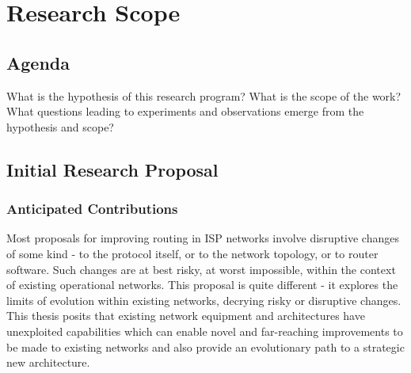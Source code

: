 \chapter{Research Scope}

\section{Agenda}

What is the hypothesis of this research program?
What is the scope of the work?
What questions leading to experiments and observations emerge from the hypothesis and scope?





\section{Initial Research Proposal}

\subsection{Anticipated Contributions}

Most proposals for improving routing in ISP networks involve disruptive changes of some kind - to the protocol itself, or to the network topology, or to router software. Such changes are at best risky, at worst impossible, within the context of existing operational networks. This proposal is quite different - it explores the limits of evolution within existing networks, decrying risky or disruptive changes. This thesis posits that existing network equipment and architectures have unexploited capabilities which can enable novel and far-reaching improvements to be made to existing networks and also provide an evolutionary path to a strategic new architecture.

